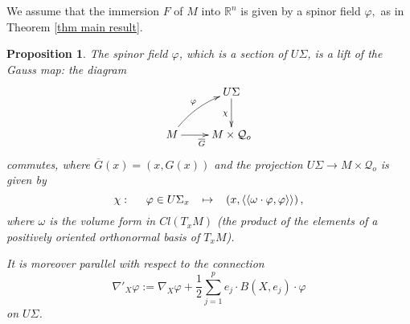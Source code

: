 \documentclass{amsart}
\newtheorem{prop}[lem]{Proposition}
\begin{document}
We assume that the immersion $F$ of $M$ into ${\mathbb{R}}^n$ is given by a spinor field $\varphi,$ as in Theorem \ref{thm main result}.
\begin{prop}
The spinor field $\varphi$, which is a section of $U\Sigma$, is a lift of the Gauss map: the diagram 
$$\xymatrix{
  &U\Sigma \ar[d]_{\chi}\\
   M\ar@/^/[ur]^\varphi\ar[r]_{\overline{G}} & M\times\mathcal{Q}_o
  }$$
commutes, where $\overline{G}(x)=(x,G(x))$ and the projection $U\Sigma\rightarrow M\times \mathcal{Q}_o$ is given by 
\begin{equation}\label{def p}
\chi:\hspace{.5cm} \varphi\in U\Sigma_x\hspace{.3cm}\mapsto\hspace{.3cm} \left(x,\langle\langle\omega\cdot\varphi,\varphi\rangle\rangle\right),
\end{equation}
where $\omega$ is the volume form in $Cl(T_xM)$ (the product of the elements of a positively oriented orthonormal basis of $T_xM$).

It is moreover parallel with respect to the connection 
$$\nabla'_X\varphi:=\nabla_X\varphi+\frac{1}{2}\sum_{j=1}^pe_j\cdot B(X,e_j)\cdot\varphi$$
on $U\Sigma$.
\end{prop}
\end{document}
